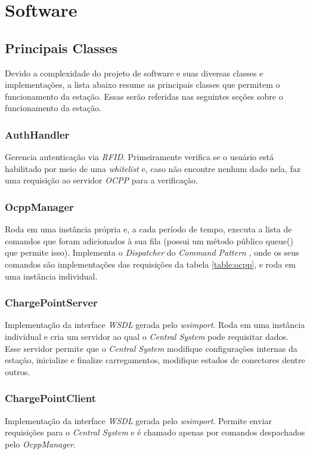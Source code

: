   \section{Software}
  \label{methodology:structure:sw}

    \subsection{Principais Classes}

    Devido a complexidade do projeto de software e suas diversas classes e implementações, a lista abaixo resume as principais classes que permitem o funcionamento da estação. Essas serão referidas nas seguintes seções sobre o funcionamento da estação. 

        \subsubsection{AuthHandler}
          Gerencia autenticação via \textit{\textit{\ac{RFID}}}. Primeiramente verifica se o usuário está habilitado por meio de uma \textit{whitelist} e, caso não encontre nenhum dado nela, faz uma requisição ao servidor \textit{\ac{OCPP}} para a verificação.
        \subsubsection{OcppManager}
          Roda em uma instância própria e, a cada período de tempo, executa a lista de comandos que foram adicionados à sua fila (possui um método público queue() que permite isso). Implementa o \textit{Dispatcher} do \textit{Command Pattern} \cite{book-gof}, onde os seus comandos são implementações das requisições da tabela \ref{table:ocpp}, e roda em uma instância individual.
        \subsubsection{ChargePointServer}
          Implementação da interface \textit{\ac{WSDL}} gerada pelo \textit{wsimport}. Roda em uma instância individual e cria um servidor ao qual o \textit{Central System} pode requisitar dados. Esse servidor permite que o \textit{Central System} modifique configurações internas da estação, inicialize e finalize carregamentos, modifique estados de conectores dentre outros.
        \subsubsection{ChargePointClient}
          Implementação da interface \textit{\ac{WSDL}} gerada pelo \textit{wsimport}. Permite enviar requisições para o \textit{Central System} e é chamado apenas por comandos despachados pelo \textit{OcppManager}.
